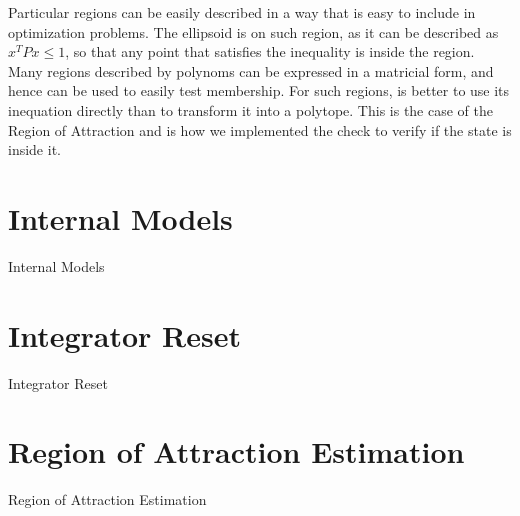 Particular regions can be easily described in a way that is easy to include in
optimization problems. The ellipsoid is on such region, as it can be described
as \(x^{T}Px\leq{}1\), so that any point that satisfies the inequality is inside
the region. Many regions described by polynoms can be expressed in a matricial
form, and hence can be used to easily test membership. For such regions, is
better to use its inequation directly than to transform it into a polytope.
This is the case of the Region of Attraction and is how we implemented the check
to verify if the state is inside it.

\section{Internal Models}%
\label{sec:internal-models}

Internal Models

\section{Integrator Reset}%
\label{sec:integrator-reset}

Integrator Reset

\section{Region of Attraction Estimation}%
\label{sec:roa-estimation}

Region of Attraction Estimation
